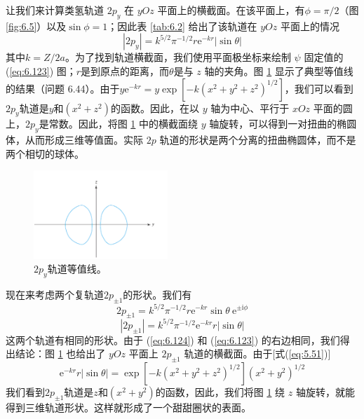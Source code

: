     让我们来计算类氢轨道 $2p_y$ 在 $yOz$ 平面上的横截面。在该平面上，有$\phi = \pi/2$（图\ref{fig:6.5}）以及$\sin\phi = 1$；因此表 \ref{tab:6.2} 给出了该轨道在 $yOz$ 平面上的情况
    \begin{equation}
        \left|2p_y\right| = k^{5/2}\pi^{-1/2}r\mathrm{e}^{-kr}\left|\sin\theta\right|
        \label{eq:6.123}
    \end{equation}
    其中$k = Z/2a$。为了找到轨道横截面，我们使用平面极坐标来绘制 $\psi$ 固定值的 (\ref{eq:6.123}) 图；$r$是到原点的距离，而$\theta$是与 $z$ 轴的夹角。图 \ref{fig:6.12} 显示了典型等值线的结果（问题 6.44）。由于$y\mathrm{e}^{-kr} = y\exp\left[-k\left(x^2+y^2+z^2\right)^{1/2}\right]$，我们可以看到$2p_y$轨道是$y$和$\left(x^2+z^2\right)$的函数。因此，在以 $y$ 轴为中心、平行于 $xOz$ 平面的圆上，$2p_y$是常数。因此，将图 \ref{fig:6.12} 中的横截面绕 $y$ 轴旋转，可以得到一对扭曲的椭圆体，从而形成三维等值面。实际 $2p$ 轨道的形状是两个分离的扭曲椭圆体，而不是两个相切的球体。
    \begin{figure}[ht]
        \centering
        \includegraphics[width=0.45\textwidth]{Figures/6.12.png}
        \caption{$2p_y$轨道等值线。}
        \label{fig:6.12}
    \end{figure}

    现在来考虑两个复轨道$2p_{\pm 1}$的形状。我们有
    \begin{equation*}
        2p_{\pm 1} = k^{5/2}\pi^{-1/2}r\mathrm{e}^{-kr}\sin\theta\:\mathrm{e}^{\pm \mathrm{i}\phi}
    \end{equation*}
    \begin{equation}
        \left|2p_{\pm 1}\right| = k^{5/2}\pi^{-1/2}\mathrm{e}^{-kr}r\left|\sin\theta\right|
        \label{eq:6.124}
    \end{equation}
    这两个轨道有相同的形状。由于 (\ref{eq:6.124}) 和 (\ref{eq:6.123}) 的右边相同，我们得出结论：图 \ref{fig:6.12} 也给出了 $yOz$ 平面上 $2p_{\pm 1}$ 轨道的横截面。由于[式(\ref{eq:5.51})]
    \begin{equation*}
        \mathrm{e}^{-kr}r\left|\sin\theta\right| = \exp\left[-k\left(x^2+y^2+z^2\right)^{1/2}\right]\left(x^2+y^2\right)^{1/2}
    \end{equation*}
    我们看到$2p_{\pm 1}$轨道是$z$和$\left(x^2+y^2\right)$的函数，因此，我们将图 \ref{fig:6.12} 绕 $z$ 轴旋转，就能得到三维轨道形状。这样就形成了一个甜甜圈状的表面。

